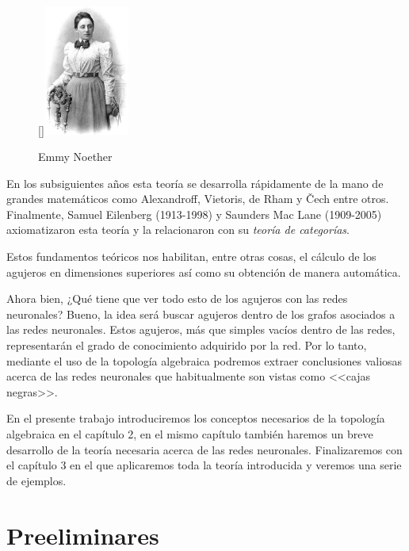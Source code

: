 \documentclass[12pt, a4paper, twoside]{book}
\numberwithin{equation}{section}
\theoremstyle{definition}
\theoremstyle{remark}
\theoremstyle{plain}
\begin{document}
	\begin{figure}
	  \begin{center}
		  \raisebox{16pt}[\dimexpr{}\baselineskip\relax]{\includegraphics[width=0.25\textwidth]{Images/315px-Noether.jpg}}
	  \vspace*{-9mm}
	  \caption*{Emmy Noether}
	  \end{center}
	\end{figure}

	En los subsiguientes años esta teoría se desarrolla rápidamente de la 
	mano de grandes matemáticos como Alexandroff, Vietoris, de Rham y 
	\v{C}ech entre otros. Finalmente, Samuel Eilenberg (1913-1998) y 
	Saunders Mac Lane (1909-2005) axiomatizaron esta teoría y la 
	relacionaron con su \emph{teoría de categorías}. 

	Estos fundamentos teóricos nos habilitan, entre otras cosas, el 
	cálculo de los agujeros en dimensiones superiores así como su 
	obtención de manera automática.

	Ahora bien, ¿Qué tiene que ver todo esto de los agujeros con las redes 
	neuronales? Bueno, la idea será buscar agujeros dentro de los grafos 
	asociados a las redes neuronales. Estos agujeros, más que simples 
	vacíos dentro de las redes, representarán el grado de conocimiento 
	adquirido por la red. Por lo tanto, mediante el uso de la topología 
	algebraica podremos extraer conclusiones valiosas acerca de las redes 
	neuronales que habitualmente son vistas como <<cajas negras>>.

	En el presente trabajo introduciremos los conceptos necesarios de la 
	topología algebraica en el capítulo 2, en el mismo capítulo también 
	haremos un breve desarrollo de la teoría necesaria acerca de las redes 
	neuronales. Finalizaremos con el capítulo 3 en el que aplicaremos toda
	la teoría introducida y veremos una serie de ejemplos.
	
	\chapter{Preeliminares}
\end{document}
